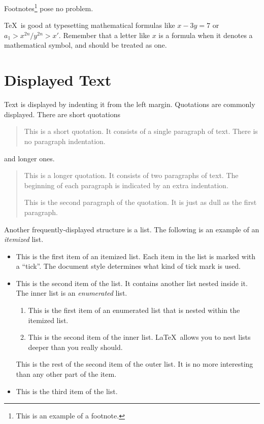 \documentclass{cernatsreport}    %
\begin{document}
Footnotes\footnote{This is an example of a footnote.}
pose no problem.

\TeX\ is good at typesetting mathematical formulas like
       \( x-3y = 7 \)
or
       \( a_{1} > x^{2n} / y^{2n} > x' \). 
Remember that a letter like
       $x$        %
is a formula when it denotes a mathematical symbol, and should
be treated as one. 

\section{Displayed Text}

Text is displayed by indenting it from the left margin.
Quotations are commonly displayed.  There are short quotations
\begin{quote}
   This is a short quotation.  It consists of a
   single paragraph of text.  There is no paragraph
   indentation.
\end{quote}
and longer ones.
\begin{quotation}
   This is a longer quotation.  It consists of two paragraphs
        of text.  The beginning of each paragraph is indicated
   by an extra indentation.

   This is the second paragraph of the quotation.  It is just
   as dull as the first paragraph.
\end{quotation}
Another frequently-displayed structure is a list.
The following is an example of an {\em itemized} list.
\begin{itemize}
   \item  This is the first item of an itemized list.  Each item
          in the list is marked with a ``tick''.  The document
          style determines what kind of tick mark is used.

   \item  This is the second item of the list.  It contains another
          list nested inside it.  The inner list is an {\em enumerated}
          list.
          \begin{enumerate}
              \item This is the first item of an enumerated list that
                    is nested within the itemized list.

              \item This is the second item of the inner list.  \LaTeX\
                    allows you to nest lists deeper than you really should.
          \end{enumerate}
          This is the rest of the second item of the outer list.  It
          is no more interesting than any other part of the item.
   \item  This is the third item of the list.
\end{itemize}
\end{document}
